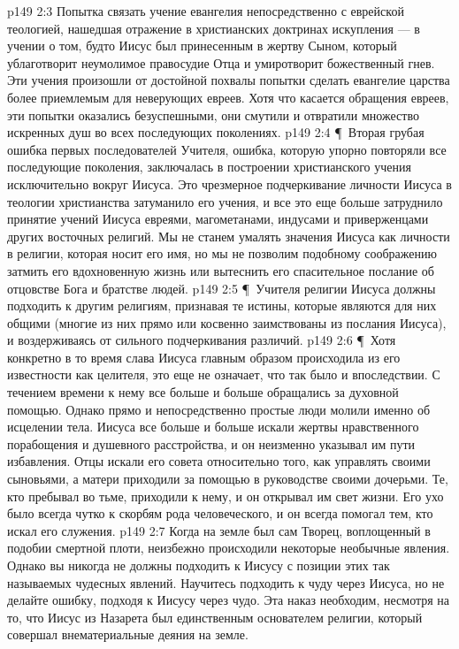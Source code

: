 \vs p149 2:3 \bibnobreakspace Попытка связать учение евангелия непосредственно с еврейской теологией, нашедшая отражение в христианских доктринах искупления --- в учении о том, будто Иисус был принесенным в жертву Сыном, который ублаготворит неумолимое правосудие Отца и умиротворит божественный гнев. Эти учения произошли от достойной похвалы попытки сделать евангелие царства более приемлемым для неверующих евреев. Хотя что касается обращения евреев, эти попытки оказались безуспешными, они смутили и отвратили множество искренных душ во всех последующих поколениях.
\vs p149 2:4 \P\ \bibnobreakspace Вторая грубая ошибка первых последователей Учителя, ошибка, которую упорно повторяли все последующие поколения, заключалась в построении христианского учения исключительно вокруг  Иисуса. Это чрезмерное подчеркивание личности Иисуса в теологии христианства затуманило его учения, и все это еще больше затруднило принятие учений Иисуса евреями, магометанами, индусами и приверженцами других восточных религий. Мы не станем умалять значения Иисуса как личности в религии, которая носит его имя, но мы не позволим подобному соображению затмить его вдохновенную жизнь или вытеснить его спасительное послание об отцовстве Бога и братстве людей.
\vs p149 2:5 \P\ Учителя религии Иисуса должны подходить к другим религиям, признавая те истины, которые являются для них общими (многие из них прямо или косвенно заимствованы из послания Иисуса), и воздерживаясь от сильного подчеркивания различий.
\vs p149 2:6 \P\ Хотя конкретно в то время слава Иисуса главным образом происходила из его известности как целителя, это еще не означает, что так было и впоследствии. С течением времени к нему все больше и больше обращались за духовной помощью. Однако прямо и непосредственно простые люди молили именно об исцелении тела. Иисуса все больше и больше искали жертвы нравственного порабощения и душевного расстройства, и он неизменно указывал им пути избавления. Отцы искали его совета относительно того, как управлять своими сыновьями, а матери приходили за помощью в руководстве своими дочерьми. Те, кто пребывал во тьме, приходили к нему, и он открывал им свет жизни. Его ухо было всегда чутко к скорбям рода человеческого, и он всегда помогал тем, кто искал его служения.
\vs p149 2:7 Когда на земле был сам Творец, воплощенный в подобии смертной плоти, неизбежно происходили некоторые необычные явления. Однако вы никогда не должны подходить к Иисусу с позиции этих так называемых чудесных явлений. Научитесь подходить к чуду через Иисуса, но не делайте ошибку, подходя к Иисусу через чудо. Эта наказ необходим, несмотря на то, что Иисус из Назарета был единственным основателем религии, который совершал внематериальные деяния на земле.
